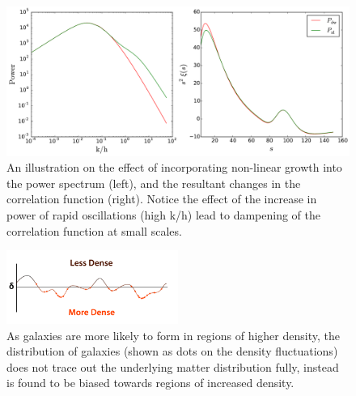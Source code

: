 \documentclass[titlesmallcaps, examinerscopy, copyrightpage]{uqthesis}
\begin{document}
\begin{figure}[h!]
  \begin{center}
    \includegraphics[width=\textwidth]{images/nlExample.pdf}
  \end{center}
  \caption{An illustration on the effect of incorporating non-linear growth into the power spectrum (left), and the resultant changes in the correlation function (right). Notice the effect of the increase in power of rapid oscillations (high k/h) lead to dampening of the correlation function at small scales.}
  \label{fig:nlExample}
\end{figure}

\begin{figure}[h!]
  \begin{center}
    \includegraphics[width=0.5\textwidth]{images/Bias.png}
  \end{center}
  \caption{As galaxies are more likely to form in regions of higher density, the distribution of galaxies (shown as dots on the density fluctuations) does not trace out the underlying matter distribution fully, instead is found to be biased towards regions of increased density.}
  \label{fig:bias}
\end{figure}
\end{document}
